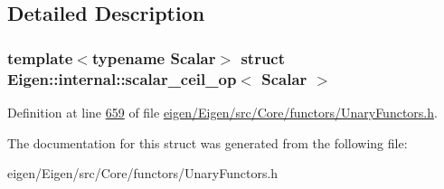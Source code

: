 \subsection{Detailed Description}
\subsubsection*{template$<$typename Scalar$>$\newline
struct Eigen\+::internal\+::scalar\+\_\+ceil\+\_\+op$<$ Scalar $>$}



Definition at line \hyperlink{eigen_2_eigen_2src_2_core_2functors_2_unary_functors_8h_source_l00659}{659} of file \hyperlink{eigen_2_eigen_2src_2_core_2functors_2_unary_functors_8h_source}{eigen/\+Eigen/src/\+Core/functors/\+Unary\+Functors.\+h}.



The documentation for this struct was generated from the following file\+:\begin{DoxyCompactItemize}
\item 
eigen/\+Eigen/src/\+Core/functors/\+Unary\+Functors.\+h\end{DoxyCompactItemize}
